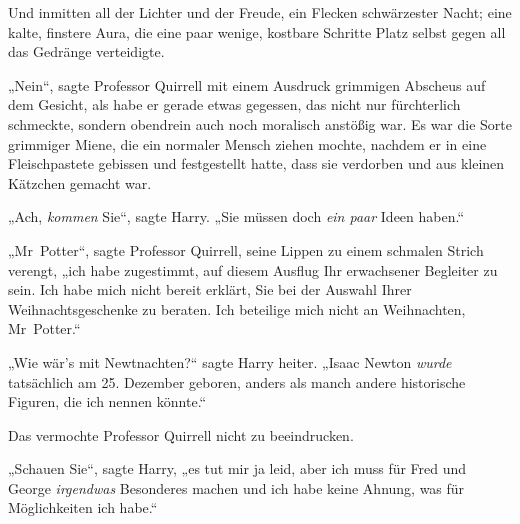 Und inmitten all der Lichter und der Freude, ein Flecken schwärzester Nacht; eine kalte, finstere Aura, die eine paar wenige, kostbare Schritte Platz selbst gegen all das Gedränge verteidigte.

„Nein“, sagte Professor Quirrell mit einem Ausdruck grimmigen Abscheus auf dem Gesicht, als habe er gerade etwas gegessen, das nicht nur fürchterlich schmeckte, sondern obendrein auch noch moralisch anstößig war. Es war die Sorte grimmiger Miene, die ein normaler Mensch ziehen mochte, nachdem er in eine Fleischpastete gebissen und festgestellt hatte, dass sie verdorben und aus kleinen Kätzchen gemacht war.

„Ach, \emph{kommen} Sie“, sagte Harry.
„Sie müssen doch \emph{ein paar} Ideen haben.“

„Mr~Potter“, sagte Professor Quirrell, seine Lippen zu einem schmalen Strich verengt, „ich habe zugestimmt, auf diesem Ausflug Ihr erwachsener Begleiter zu sein. Ich habe mich nicht bereit erklärt, Sie bei der Auswahl Ihrer Weihnachtsgeschenke zu beraten. Ich beteilige mich nicht an Weihnachten, Mr~Potter.“

„Wie wär’s mit Newtnachten?“ sagte Harry heiter.
„Isaac Newton \emph{wurde} tatsächlich am 25. Dezember geboren, anders als manch andere historische Figuren, die ich nennen könnte.“

Das vermochte Professor Quirrell nicht zu beeindrucken.

„Schauen Sie“, sagte Harry, „es tut mir ja leid, aber ich muss für Fred und George \emph{irgendwas} Besonderes machen und ich habe keine Ahnung, was für Möglichkeiten ich habe.“

